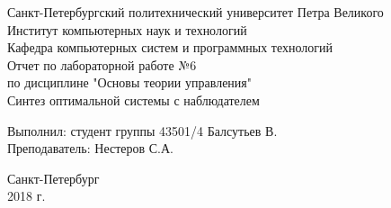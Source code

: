 	\begin{titlepage}
		\begin{center}
			Санкт-Петербургский политехнический университет Петра Великого\\
			Институт компьютерных наук и технологий\\
			Кафедра компьютерных систем и программных технологий\\
			\vspace{6cm}
			Отчет по лабораторной работе №6\\
			\vspace{0.2cm}	
			по дисциплине "Основы теории управления"\\
			\vspace{0.5cm}	
			\Large
			Синтез оптимальной системы с наблюдателем
			\small
		\end{center}
		\vspace{5cm}
		\begin{flushright}
			Выполнил: студент группы 43501/4	Балсутьев В.\\
			\vspace{0.5cm}			
			Преподаватель: Нестеров С.А.\\
		\end{flushright}
		\vspace{7cm}
		\begin{center}
			Санкт-Петербург\\
			2018 г.\\
		\end{center}
	\end{titlepage}
	\newpage